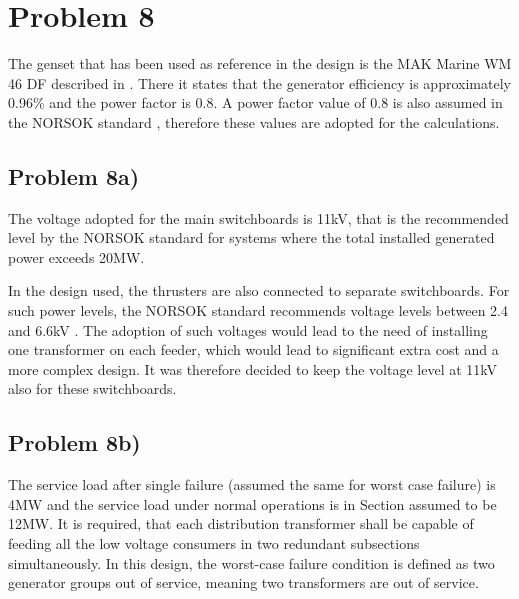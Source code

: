\section{Problem 8}
The genset that has been used as reference in the design is the MAK Marine WM 46 DF described in \cite[p.128 -129]{CatGenerators}. There it states that the generator efficiency is approximately 0.96\% and the power factor is 0.8. A power factor value of 0.8 is also assumed in the NORSOK standard \cite{NORSOKstandard}, therefore these values are adopted for the calculations. 

\subsection{Problem 8a)} \label{sec:8a)}
The voltage adopted for the main switchboards is 11kV, that is the recommended level by the NORSOK standard \cite[p.10]{NORSOKstandard} for systems where the total installed generated power exceeds 20MW.

In the design used, the thrusters are also connected to separate switchboards. For such power levels, the NORSOK standard recommends voltage levels between 2.4 and 6.6kV \cite{NORSOKstandard}. The adoption of such voltages would lead to the need of installing one transformer on each feeder, which would lead to significant extra cost and a more complex design. It was therefore decided to keep the voltage level at 11kV also for these switchboards. %




\subsection{Problem 8b)} \label{sec:8b)}
The service load after single failure (assumed the same for worst case failure) is 4MW and the service load under normal operations is in Section  assumed to be 12MW. It is required, that each distribution transformer shall be capable of feeding all the low voltage consumers in two redundant subsections simultaneously. In this design, the worst-case failure condition is defined as two generator groups out of service, meaning two transformers are out of service. 

